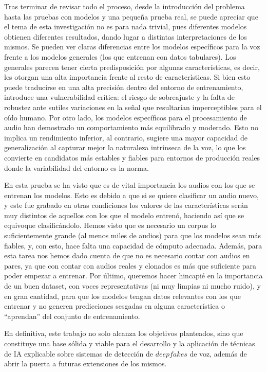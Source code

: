 Tras terminar de revisar todo el proceso, desde la introducción del problema hasta las pruebas con modelos y una pequeña prueba real, se puede apreciar que el tema de esta investigación no es para nada trivial, pues diferentes modelos obtienen diferentes resultados, dando lugar a distintas interpretaciones de los mismos. Se pueden ver claras diferencias entre los modelos específicos para la voz frente a los modelos generales (los que entrenan con datos tabulares). Los generales parecen tener cierta predisposición por algunas características, es decir, les otorgan una alta importancia frente al resto de características. Si bien esto puede traducirse en una alta precisión dentro del entorno de entrenamiento, introduce una vulnerabilidad crítica: el riesgo de sobreajuste y la falta de robustez ante sutiles variaciones en la señal que resultarían imperceptibles para el oído humano. Por otro lado, los modelos específicos para el procesamiento de audio han demostrado un comportamiento más equilibrado y moderado. Esto no implica un rendimiento inferior, al contrario, sugiere una mayor capacidad de generalización al capturar mejor la naturaleza intrínseca de la voz, lo que los convierte en candidatos más estables y fiables para entornos de producción reales donde la variabilidad del entorno es la norma.  

En esta prueba se ha visto que es de vital importancia los audios con los que se entrenan los modelos. Esto es debido a que si se quiere clasificar un audio nuevo, y este fue grabado en otras condiciones los valores de las características serán muy distintos de aquellos con los que el modelo entrenó, haciendo así que se equivoque clasificándolo. Hemos visto que es necesario un corpus lo suficientemente grande (al menos miles de audios) para que los modelos sean más fiables, y, con esto, hace falta una capacidad de cómputo adecuada. Además, para esta tarea nos hemos dado cuenta de que no es necesario contar con audios en pares, ya que con contar con audios reales y clonados es más que suficiente para poder empezar a entrenar. Por último, queremos hacer hincapié en la importancia de un buen dataset, con voces representativas (ni muy limpias ni mucho ruido), y en gran cantidad, para que los modelos tengan datos relevantes con los que entrenar y no generen predicciones sesgadas en alguna característica o ``aprendan'' del conjunto de entrenamiento.

En definitiva, este trabajo no solo alcanza los objetivos planteados, sino que constituye una base sólida y viable para el desarrollo y la aplicación de técnicas de IA explicable sobre sistemas de detección de $deepfakes$ de voz, además de abrir la puerta a futuras extensiones de los mismos.

